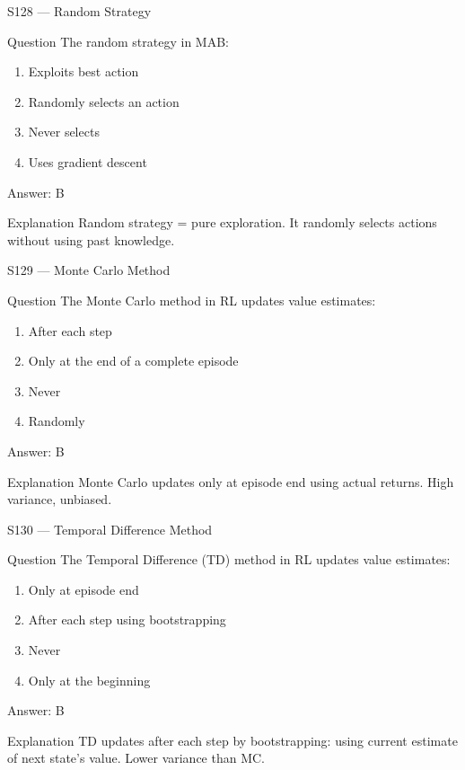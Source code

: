 \documentclass[aspectratio=169,8pt]{beamer}
\begin{document}
	\begin{frame}{S128 --- Random Strategy}
		\begin{block}{Question}
			The random strategy in MAB:
			\begin{enumerate}
				\item Exploits best action
				\item Randomly selects an action
				\item Never selects
				\item Uses gradient descent
			\end{enumerate}
		\end{block}
		\begin{exampleblock}{Answer: B}\end{exampleblock}
		\begin{block}{Explanation}
			Random strategy = pure exploration. It randomly selects actions without using past knowledge.
		\end{block}
	\end{frame}
	
	\begin{frame}{S129 --- Monte Carlo Method}
		\begin{block}{Question}
			The Monte Carlo method in RL updates value estimates:
			\begin{enumerate}
				\item After each step
				\item Only at the end of a complete episode
				\item Never
				\item Randomly
			\end{enumerate}
		\end{block}
		\begin{exampleblock}{Answer: B}\end{exampleblock}
		\begin{block}{Explanation}
			Monte Carlo updates only at episode end using actual returns. High variance, unbiased.
		\end{block}
	\end{frame}
	
	\begin{frame}{S130 --- Temporal Difference Method}
		\begin{block}{Question}
			The Temporal Difference (TD) method in RL updates value estimates:
			\begin{enumerate}
				\item Only at episode end
				\item After each step using bootstrapping
				\item Never
				\item Only at the beginning
			\end{enumerate}
		\end{block}
		\begin{exampleblock}{Answer: B}\end{exampleblock}
		\begin{block}{Explanation}
			TD updates after each step by bootstrapping: using current estimate of next state's value. Lower variance than MC.
		\end{block}
	\end{frame}
	
\end{document}
